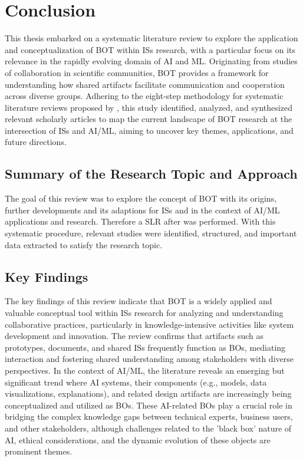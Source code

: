 \documentclass[12pt,oneside]{article}
\begin{document}
\section{Conclusion} \label{conclusion}

This thesis embarked on a systematic literature review to explore the application and conceptualization of \ac{BOT} within \ac{IS}s research, with a particular focus on its relevance in the rapidly evolving domain of \ac{AI} and \ac{ML}. Originating from studies of collaboration in scientific communities, \ac{BOT} provides a framework for understanding how shared artifacts facilitate communication and cooperation across diverse groups. Adhering to the eight-step methodology for systematic literature reviews proposed by \citet[43-44]{okoli2015guide}, this study identified, analyzed, and synthesized relevant scholarly articles to map the current landscape of BOT research at the intersection of \ac{IS}s and \ac{AI}/\ac{ML}, aiming to uncover key themes, applications, and future directions.

\subsection{Summary of the Research Topic and Approach} \label{summary-of-the-research-topic-and-approach}

The goal of this review was to explore the concept of \ac{BOT} with its origins, further developments and its adaptions for \ac{IS}s and in the context of \ac{AI}/\ac{ML} applications and research. Therefore a \ac{SLR} after \citet[43-44]{okoli2015guide} was performed. With this systematic procedure, relevant studies were identified, structured, and important data extracted to satisfy the research topic.

\subsection{Key Findings} \label{key-findings}

The key findings of this review indicate that \ac{BOT} is a widely applied and valuable conceptual tool within \ac{IS}s research for analyzing and understanding collaborative practices, particularly in knowledge-intensive activities like system development and innovation. The review confirms that artifacts such as prototypes, documents, and shared \ac{IS}s frequently function as \ac{BO}s, mediating interaction and fostering shared understanding among stakeholders with diverse perspectives. In the context of \ac{AI}/\ac{ML}, the literature reveals an emerging but significant trend where \ac{AI} systems, their components (e.g., models, data visualizations, explanations), and related design artifacts are increasingly being conceptualized and utilized as \ac{BO}s. These \ac{AI}-related \ac{BO}s play a crucial role in bridging the complex knowledge gaps between technical experts, business users, and other stakeholders, although challenges related to the 'black box' nature of \ac{AI}, ethical considerations, and the dynamic evolution of these objects are prominent themes.
\end{document}
